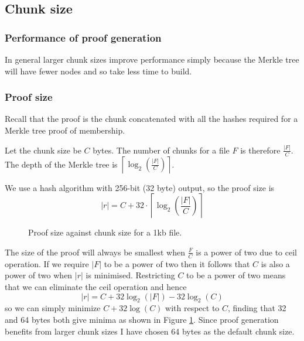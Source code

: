 \documentclass[12pt,a4paper,twoside,openright]{report}
\begin{document}
\subsection{Chunk size}

\subsubsection{Performance of proof generation}

In general larger chunk sizes improve performance simply because the Merkle tree will have fewer nodes and so take less time to build.

\subsubsection{Proof size} \label{chunk-size-proof-size}

Recall that the proof is the chunk concatenated with all the hashes required for a Merkle tree proof of membership.

Let the chunk size be $C$ bytes.
The number of chunks for a file $F$ is therefore $\frac{|F|}{C}$.
The depth of the Merkle tree is $\left\lceil\log_2\left(\frac{|F|}{C}\right)\right\rceil$.

We use a hash algorithm with 256-bit (32 byte) output, so the proof size is
\[|r| = C + 32 \cdot \left\lceil\log_2\left(\frac{|F|}{C}\right)\right\rceil\]

\begin{figure}[h]
\caption[Chunk size graph]{Proof size against chunk size for a 1kb file.}
\label{impl-graph-chunk-size}
\end{figure}


The size of the proof will always be smallest when $\frac{F}{C}$ is a power of two due to ceil operation.
If we require $|F|$ to be a power of two then it follows that $C$ is also a power of two when $|r|$ is minimised.
Restricting $C$ to be a power of two means that we can eliminate the ceil operation and hence
\[|r| = C + 32\log_2(|F|) - 32\log_2(C)\]
so we can simply minimize $C + 32\log(C)$ with respect to $C$, finding that 32 and 64 bytes both give minima as shown in Figure \ref{impl-graph-chunk-size}.
Since proof generation benefits from larger chunk sizes I have chosen 64 bytes as the default chunk size.
\end{document}
